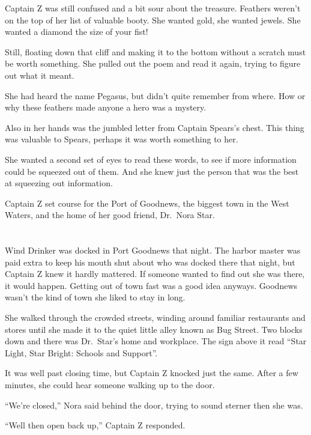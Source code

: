 \documentclass[12pt]{extbook}
\begin{document}
  Captain Z was still confused and a bit sour about the treasure. Feathers
  weren't on the top of her list of valuable booty. She wanted gold, she
  wanted jewels. She wanted a diamond the size of your fist!
  
  Still, floating down that cliff and making it to the bottom without a
  scratch must be worth something. She pulled out the poem and read it
  again, trying to figure out what it meant.
  
  She had heard the name Pegasus, but didn't quite remember from where.
  How or why these feathers made anyone a hero was a mystery.
  
  Also in her hands was the jumbled letter from Captain Spears's chest.
  This thing was valuable to Spears, perhaps it was worth something to
  her.
  
  She wanted a second set of eyes to read these words, to see if more
  information could be squeezed out of them. And she knew just the person
  that was the best at squeezing out information.
  
  Captain Z set course for the Port of Goodnews, the biggest town in the
  West Waters, and the home of her good friend, Dr.~Nora Star.
  
  \section{}\label{section-25}
  
  Wind Drinker was docked in Port Goodnews that night. The harbor master
  was paid extra to keep his mouth shut about who was docked there that
  night, but Captain Z knew it hardly mattered. If someone wanted to find
  out she was there, it would happen. Getting out of town fast was a good
  idea anyways. Goodnews wasn't the kind of town she liked to stay in
  long.
  
  She walked through the crowded streets, winding around familiar
  restaurants and stores until she made it to the quiet little alley known
  as Bug Street. Two blocks down and there was Dr.~Star's home and
  workplace. The sign above it read \enquote{Star Light, Star Bright:
  Schools and Support}.
  
  It was well past closing time, but Captain Z knocked just the same.
  After a few minutes, she could hear someone walking up to the door.
  
  \enquote{We're closed,} Nora said behind the door, trying to sound
  sterner then she was.
  
  \enquote{Well then open back up,} Captain Z responded.
  
\end{document}
